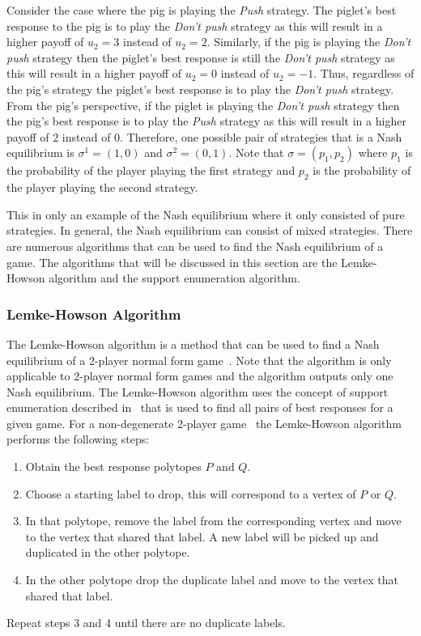 Consider the case where the pig is playing the \textit{Push} strategy.
The piglet's best response to the pig is to play the \textit{Don't push}
strategy as this will result in a higher payoff of \(u_2=3\) instead of
\(u_2=2\).
Similarly, if the pig is playing the \textit{Don't push} strategy then the
piglet's best response is still the \textit{Don't push} strategy as this will
result in a higher payoff of \(u_2=0\) instead of \(u_2=-1\).
Thus, regardless of the pig's strategy the piglet's best response is to play
the \textit{Don't push} strategy.
From the pig's perspective, if the piglet is playing the \textit{Don't push}
strategy then the pig's best response is to play the \textit{Push} strategy as
this will result in a higher payoff of \(2\) instead of \(0\).
Therefore, one possible pair of strategies that is a Nash equilibrium is
\(\sigma^1 = (1,0)\) and \(\sigma^2 = (0,1)\).
Note that \(\sigma = (p_1, p_2)\) where \(p_1\) is the probability of the player
playing the first strategy and \(p_2\) is the probability of the player
playing the second strategy. 

This in only an example of the Nash equilibrium where it only consisted of pure
strategies.
In general, the Nash equilibrium can consist of mixed strategies.
There are numerous algorithms that can be used to find the Nash equilibrium
of a game.
The algorithms that will be discussed in this section are the Lemke-Howson
algorithm and the support enumeration algorithm.


\subsubsection{Lemke-Howson Algorithm}

The Lemke-Howson algorithm is a method that can be used to find a Nash
equilibrium of a 2-player normal form game~\cite{LemkeHowson}.
Note that the algorithm is only applicable to 2-player normal form games and
the algorithm outputs only one Nash equilibrium.
The Lemke-Howson algorithm uses the concept of support enumeration described
in~\cite{nisan2007}
that is used to find all pairs of best responses for a given game.
For a non-degenerate 2-player game~\cite{degenerategames} the Lemke-Howson
algorithm performs the following steps:

\begin{enumerate}
    \item Obtain the best response polytopes \(P\) and \(Q\).
    \item Choose a starting label to drop, this will correspond to a vertex of
    \(P\) or \(Q\).
    \item In that polytope, remove the label from the corresponding vertex and
    move to the vertex that shared that label.
    A new label will be picked up and duplicated in the other polytope.
    \item In the other polytope drop the duplicate label and move to the vertex
    that shared that label.
\end{enumerate}
Repeat steps 3 and 4 until there are no duplicate labels.

